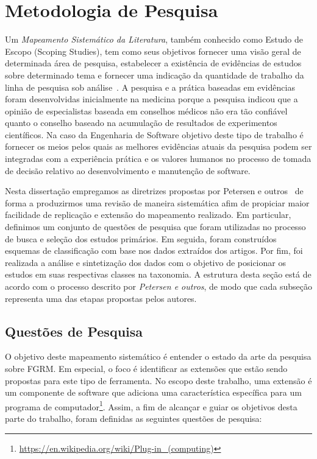 \section{Metodologia de Pesquisa}
\label{sec:map-metodologia}

Um \textit{Mapeamento Sistemático da Literatura}, também conhecido como Estudo
de Escopo (Scoping Studies), tem como seus objetivos fornecer uma visão geral de
determinada área de pesquisa, estabelecer a existência de evidências de estudos
sobre determinado tema e fornecer uma indicação da quantidade de trabalho da
linha de pesquisa sob
análise~\cite{keele2007guidelines,wohlin2012experimentation}. A pesquisa e a
prática baseadas em evidências foram desenvolvidas inicialmente na medicina
porque a pesquisa indicou que a opinião de especialistas baseada em conselhos
médicos não era tão confiável quanto o conselho baseado na acumulação de
resultados de experimentos científicos. Na caso da Engenharia de Software
objetivo deste tipo de trabalho é fornecer os meios pelos quais as melhores
evidências atuais da pesquisa podem ser integradas com a experiência prática e
os valores humanos no processo de tomada de decisão relativo ao desenvolvimento
e manutenção de software.

Nesta dissertação empregamos as diretrizes propostas por Petersen e
outros~\cite{Petersen2008} de forma a produzirmos uma revisão de maneira
sistemática afim de propiciar maior facilidade de replicação e extensão do
mapeamento realizado. Em particular, definimos um conjunto de questões de
pesquisa que foram utilizadas no processo de busca e seleção dos estudos
primários. Em seguida, foram construídos esquemas de classificação com base nos
dados extraídos dos artigos. Por fim, foi realizada a análise e sintetização dos
dados com o objetivo de posicionar os estudos em suas respectivas classes na
taxonomia. A estrutura desta seção está de acordo com o processo descrito por
\textit{Petersen e outros}, de modo que cada subseção representa uma das etapas
propostas pelos autores.

\subsection{Questões de Pesquisa}
\label{subsec:map-questoes-de-pesquisa}

O objetivo deste mapeamento sistemático é entender o estado da arte da pesquisa
sobre FGRM\@. Em especial, o foco é identificar as extensões que estão sendo
propostas para este tipo de ferramenta.  No escopo deste trabalho, uma extensão
é um componente de software que adiciona uma característica específica para um
programa de
computador\footnote{\url{https://en.wikipedia.org/wiki/Plug-in_(computing)}}.
Assim, a fim de alcançar e guiar os objetivos desta parte do trabalho, foram
definidas as seguintes questões de pesquisa:

